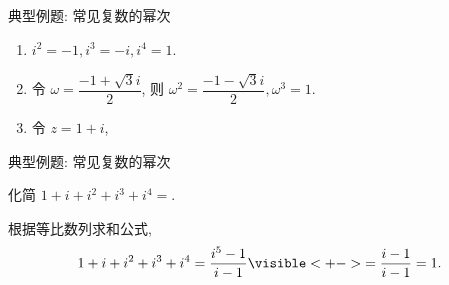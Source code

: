 \begin{frame}{典型例题: 常见复数的幂次}
\onslide<+->
\begin{example}
\begin{enumerate}
\item $i^2=-1,i^3=-i,i^4=1$.
%
\item 令 $\omega=\dfrac{-1+\sqrt 3i}2$, 则 $\omega^2=\dfrac{-1-\sqrt3i}2,\omega^3=1$.
\item 令 $z=1+i$, 
\vspace{-\baselineskip}
\end{enumerate}
\end{example}
\end{frame}


\begin{frame}{典型例题: 常见复数的幂次}
\onslide<+->
\begin{example}
化简 $1+i+i^2+i^3+i^4=$.
\end{example}
\onslide<+->
\begin{solution}
根据等比数列求和公式,
\[1+i+i^2+i^3+i^4=\frac{i^5-1}{i-1}
\visible<+->{=\frac{i-1}{i-1}=1.}\]
\vspace{-\baselineskip}
\end{solution}
\end{frame}





